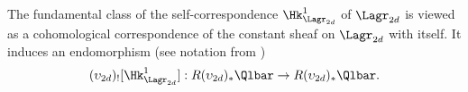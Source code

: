 %
%
%
%

The fundamental class of the self-correspondence $\Hk^{1}_{\Lagr_{2d}}$ of $\Lagr_{2d}$ is viewed as a cohomological correspondence of the constant sheaf on $\Lagr_{2d}$ with itself. It induces an endomorphism (see notation from \cite[A.4.1]{YZ})
\begin{equation}
(\upsilon_{2d})_{!}[\Hk^{1}_{\Lagr_{2d}}]:R(\upsilon_{2d})_{*}\Qlbar\to R(\upsilon_{2d})_{*}\Qlbar.
\end{equation}


